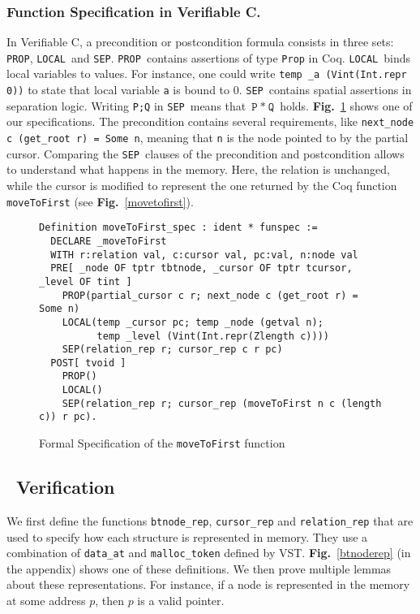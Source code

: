 \def\prop{\lstinline[language=Coq]{PROP}}
\def\local{\lstinline[language=Coq]{LOCAL}}
\def\sep{\lstinline[language=Coq]{SEP}}

\subsubsection{Function Specification in Verifiable C.}
In Verifiable C, a precondition or postcondition formula consists in three sets: \prop, \local\ and \sep.
\prop\ contains assertions of type \texttt{Prop} in Coq.
\local\ binds local variables to values. For instance, one could write \texttt{temp \_a (Vint(Int.repr 0))} to state that local variable \texttt{a} is bound to 0.
\sep\ contains spatial assertions in separation logic. Writing \texttt{P;Q} in \sep\ means that $\texttt{P}~*~\texttt{Q}$ holds.
\textbf{Fig.}~\ref{spec} shows one of our specifications.
The precondition contains several requirements, like \texttt{next\_node c (get\_root r) = Some n}, meaning that \texttt{n} is the node pointed to by the partial cursor.
Comparing the \sep\ clauses of the precondition and postcondition allows to understand what happens in the memory.
Here, the relation is unchanged, while the cursor is modified to represent the one returned by the Coq function \texttt{moveToFirst} (see \textbf{Fig.}~\ref{movetofirst}).

\begin{figure}
\begin{lstlisting}[language=Coq]
Definition moveToFirst_spec : ident * funspec :=
  DECLARE _moveToFirst
  WITH r:relation val, c:cursor val, pc:val, n:node val
  PRE[ _node OF tptr tbtnode, _cursor OF tptr tcursor, _level OF tint ]
    PROP(partial_cursor c r; next_node c (get_root r) = Some n)
    LOCAL(temp _cursor pc; temp _node (getval n);
          temp _level (Vint(Int.repr(Zlength c))))
    SEP(relation_rep r; cursor_rep c r pc)
  POST[ tvoid ]
    PROP()
    LOCAL()
    SEP(relation_rep r; cursor_rep (moveToFirst n c (length c)) r pc).
\end{lstlisting}
\caption{Formal Specification of the \texttt{moveToFirst} function}
\label{spec}
\end{figure}



\subsection{\btrees\ Verification}
We first define the functions \texttt{btnode\_rep}, \texttt{cursor\_rep} and \texttt{relation\_rep} that are used to specify how each structure is represented in memory.
They use a combination of \texttt{data\_at} and \texttt{malloc\_token} defined by VST.
\textbf{Fig.}~\ref{btnoderep} (in the appendix) shows one of these definitions.
We then prove multiple lemmas about these representations. For instance, if a node is represented in the memory at some address $p$, then $p$ is a valid pointer.

